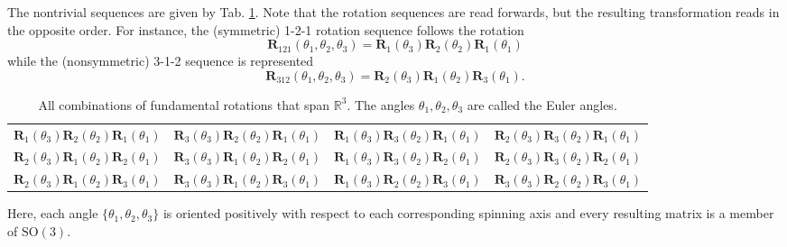 \documentclass[11pt,dvipsnames]{thesis}
\begin{document}
The nontrivial sequences are given by Tab. \ref{tab:NontrivialEulerAngles}. Note that the rotation sequences are read forwards, but the resulting transformation reads in the opposite order. For instance, the (symmetric) 1-2-1 rotation sequence follows the rotation
\begin{equation}
\mathbf{R}_{121}(\theta_1, \theta_2, \theta_3) = \mathbf{R}_1(\theta_3) \mathbf{R}_2(\theta_2) \mathbf{R}_1(\theta_1)
\end{equation}
while the (nonsymmetric) 3-1-2 sequence is represented
\begin{equation}
\mathbf{R}_{312}(\theta_1, \theta_2, \theta_3) = \mathbf{R}_2(\theta_3) \mathbf{R}_1(\theta_2) \mathbf{R}_3(\theta_1).
\end{equation}
\begin{table}[H]
\centering
\caption{All combinations of fundamental rotations that span $\mathbb{R}^3$. The angles $\theta_1, \theta_2, \theta_3$ are called the Euler angles.}
\label{tab:NontrivialEulerAngles}
\begin{tabular}{cccc}
\toprule
$\mathbf{R}_1(\theta_3)\mathbf{R}_2(\theta_2)\mathbf{R}_1(\theta_1)$ & $\mathbf{R}_3(\theta_3)\mathbf{R}_2(\theta_2)\mathbf{R}_1(\theta_1)$ & $\mathbf{R}_1(\theta_3)\mathbf{R}_3(\theta_2)\mathbf{R}_1(\theta_1)$ & $\mathbf{R}_2(\theta_3)\mathbf{R}_3(\theta_2)\mathbf{R}_1(\theta_1)$ \\ %
$\mathbf{R}_2(\theta_3)\mathbf{R}_1(\theta_2)\mathbf{R}_2(\theta_1)$ & $\mathbf{R}_3(\theta_3)\mathbf{R}_1(\theta_2)\mathbf{R}_2(\theta_1)$ & $\mathbf{R}_1(\theta_3)\mathbf{R}_3(\theta_2)\mathbf{R}_2(\theta_1)$ & $\mathbf{R}_2(\theta_3)\mathbf{R}_3(\theta_2)\mathbf{R}_2(\theta_1)$ \\ %
$\mathbf{R}_2(\theta_3)\mathbf{R}_1(\theta_2)\mathbf{R}_3(\theta_1)$ & $\mathbf{R}_3(\theta_3)\mathbf{R}_1(\theta_2)\mathbf{R}_3(\theta_1)$ & $\mathbf{R}_1(\theta_3)\mathbf{R}_2(\theta_2)\mathbf{R}_3(\theta_1)$ & $\mathbf{R}_3(\theta_3)\mathbf{R}_2(\theta_2)\mathbf{R}_3(\theta_1)$ \\ \bottomrule%
\end{tabular}
\end{table}
Here, each angle $\{\theta_1, \theta_2, \theta_3\}$ is oriented positively with respect to each corresponding spinning axis and every resulting matrix is a member of $\mathrm{SO}(3)$.
\end{document}
